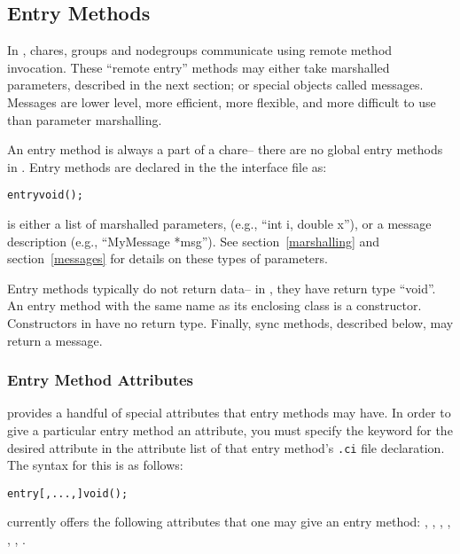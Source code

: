 \subsection{Entry Methods}
\label{entry}

In \charmpp, chares, groups and 
nodegroups communicate using remote method invocation.  These ``remote entry'' methods may either take marshalled parameters, described in the next section; or special objects called messages.  Messages are lower level, more efficient, more flexible, and more difficult to use than parameter marshalling.

An entry method is always a part of a chare--
there are no global entry methods in \charmpp{}.
Entry methods are declared in the the interface file as:

\begin{alltt}
entry void ();
\end{alltt}

 is either a list of marshalled parameters,
(e.g., ``int i, double x''), or a message description (e.g.,
``MyMessage *msg'').  See section~\ref{marshalling} and
section~\ref{messages} for details on these types of
parameters.

Entry methods typically do not return data-- in \CC, they have
return type ``void''.  An entry method with the same name
as its enclosing class is a constructor.  Constructors in \CC
have no return type.  Finally, sync methods, described below,
may return a message.

\subsubsection{Entry Method Attributes}
\label{attributes}

\charmpp{}  provides a handful of special attributes that entry methods may have.  In order to give a particular entry method an attribute, you must specify the keyword for the desired
attribute in the attribute list of that entry method's {\tt .ci} file
declaration.  The syntax for this is as follows:

\begin{alltt}
entry [, ..., ] void ();
\end{alltt}

\charmpp{} currently offers the following attributes that one may give an 
entry method:
, , , , , , .

